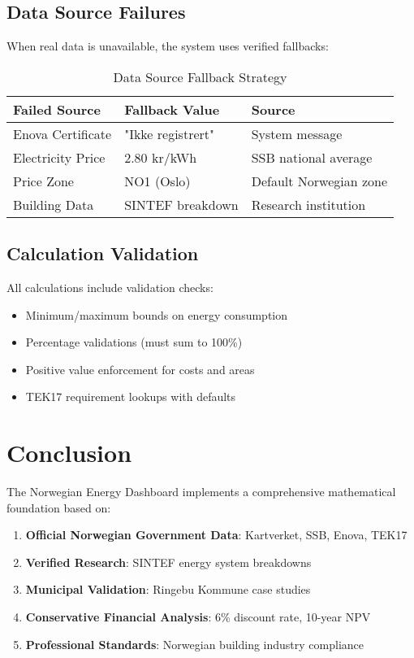 \documentclass[12pt,a4paper]{article}
\begin{document}
\subsection{Data Source Failures}

When real data is unavailable, the system uses verified fallbacks:

\begin{table}[H]
\centering
\begin{tabular}{|l|l|l|}
\hline
\textbf{Failed Source} & \textbf{Fallback Value} & \textbf{Source} \\
\hline
Enova Certificate & "Ikke registrert" & System message \\
Electricity Price & 2.80 kr/kWh & SSB national average \\
Price Zone & NO1 (Oslo) & Default Norwegian zone \\
Building Data & SINTEF breakdown & Research institution \\
\hline
\end{tabular}
\caption{Data Source Fallback Strategy}
\end{table}

\subsection{Calculation Validation}

All calculations include validation checks:

\begin{itemize}
\item Minimum/maximum bounds on energy consumption
\item Percentage validations (must sum to 100\%)
\item Positive value enforcement for costs and areas
\item TEK17 requirement lookups with defaults
\end{itemize}

\section{Conclusion}

The Norwegian Energy Dashboard implements a comprehensive mathematical foundation based on:

\begin{enumerate}
\item \textbf{Official Norwegian Government Data}: Kartverket, SSB, Enova, TEK17
\item \textbf{Verified Research}: SINTEF energy system breakdowns
\item \textbf{Municipal Validation}: Ringebu Kommune case studies
\item \textbf{Conservative Financial Analysis}: 6\% discount rate, 10-year NPV
\item \textbf{Professional Standards}: Norwegian building industry compliance
\end{enumerate}
\end{document}
